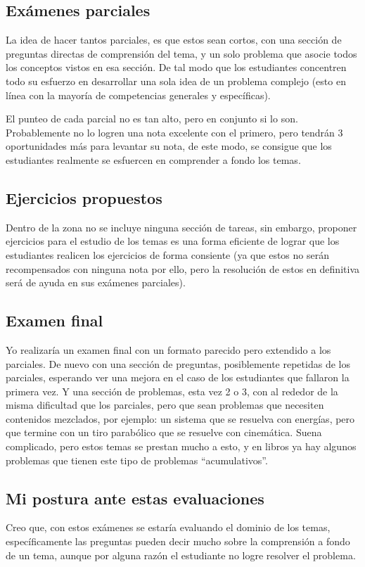 \subsection{Exámenes parciales}
La idea de hacer tantos parciales, es que estos sean cortos, con una sección de preguntas directas de comprensión del tema, y un solo problema que asocie todos los conceptos vistos en esa sección. De tal modo que los estudiantes concentren todo su esfuerzo en desarrollar una sola idea de un problema complejo (esto en línea con la mayoría de competencias generales y específicas).

El punteo de cada parcial no es tan alto, pero en conjunto si lo son. Probablemente no lo logren una nota excelente con el primero, pero tendrán 3 oportunidades más para levantar su nota, de este modo, se consigue que los estudiantes realmente se esfuercen en comprender a fondo los temas.

\subsection{Ejercicios propuestos}
Dentro de la zona no se incluye ninguna sección de tareas, sin embargo, proponer ejercicios para el estudio de los temas es una forma eficiente de lograr que los estudiantes realicen los ejercicios de forma consiente (ya que estos no serán recompensados con ninguna nota por ello, pero la resolución de estos en definitiva será de ayuda en sus exámenes parciales).

\subsection{Examen final}
Yo realizaría un examen final con un formato parecido pero extendido a los parciales. De nuevo con una sección de preguntas, posiblemente repetidas de los parciales, esperando ver una mejora en el caso de los estudiantes que fallaron la primera vez. Y una sección de problemas, esta vez 2 o 3, con al rededor de la misma dificultad que los parciales, pero que sean problemas que necesiten contenidos mezclados, por ejemplo: un sistema que se resuelva con energías, pero que termine con un tiro parabólico que se resuelve con cinemática.
Suena complicado, pero estos temas se prestan mucho a esto, y en libros ya hay algunos problemas que tienen este tipo de problemas ``acumulativos''.

\subsection{Mi postura ante estas evaluaciones}
Creo que, con estos exámenes se estaría evaluando el dominio de los temas, específicamente las preguntas pueden decir mucho sobre la comprensión a fondo de un tema, aunque por alguna razón el estudiante no logre resolver el problema.

